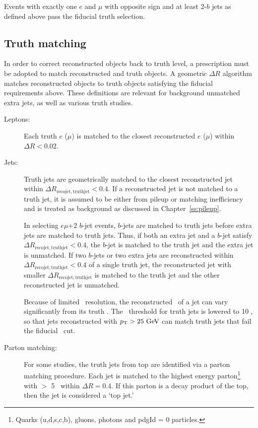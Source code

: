 Events with exactly one $e$ and $\mu$ with opposite sign and at least 2-$b$ jets as defined above pass the fiducial truth selection.

\subsection{Truth matching}

\label{ss:tmatching}
In order to correct reconstructed objects back to truth level, a prescription must be adopted to match reconstructed and truth objects. A geometric $\Delta R$ algorithm matches reconstructed objects to truth objects satisfying the fiducial requirements above. These definitions are relevant for background unmatched extra jets, as well as various truth studies.
\begin{description}
\item[Leptons:] Each truth $e$ ($\mu$) is matched to the closest reconstructed $e$ ($\mu$) within $\Delta R < 0.02$.
\item[Jets:] Truth jets are geometrically matched to the closest reconstructed jet within $\Delta R_{\mathrm{reco jet, truth jet}} < 0.4$. If a reconstructed jet is not matched to a truth jet, it is assumed to be either from pileup or matching inefficiency and is treated as background as discussed in Chapter~\ref{ss:pileup}.

In selecting $e\mu$+2 $b$-jet events, $b$-jets are matched to truth jets before extra jets are matched to truth jets. Thus, if both an extra jet and a $b$-jet satisfy $\Delta R_{\mathrm{reco jet, truth jet}}<0.4$, the $b$-jet is matched to the truth jet and the extra jet is unmatched. If two $b$-jets or two extra jets are reconstructed within $\Delta R_{\mathrm{reco jet, truth jet}}<0.4$ of a single truth jet, the reconstructed jet with smaller $\Delta R_{\mathrm{reco jet, truth jet}}$ is matched to the truth jet and the other reconstructed jet is unmatched.

Because of limited \pt\ resolution, the reconstructed \pt\ of a jet can vary significantly from its truth \pt. The \pt\ threshold for truth jets is lowered to 10 \GeV, so that jets reconstructed with $\pt > 25 \GeV$ can match truth jets that fail the fiducial \pt\ cut. 



\item[Parton matching:] For some studies, the truth jets from top are identified via a parton matching procedure. Each jet is matched to the highest energy parton\footnote{Quarks (u,d,s,c,b), gluons, photons and pdgId = 0 particles.} with \pt $>$ 5 \GeV\ within $\Delta R = 0.4$. If this parton is a decay product of the top, then the jet is considered a `top jet.'
\end{description}
